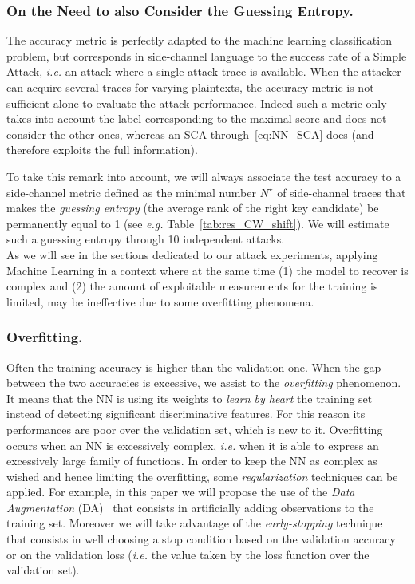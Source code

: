 \subsubsection{On the Need to also Consider the Guessing Entropy.} The accuracy metric is perfectly adapted to the machine learning classification problem, but corresponds in side-channel language to the success rate of a Simple Attack, \emph{i.e.} an attack where a single attack trace is available. When the attacker can acquire several traces for varying plaintexts, the accuracy metric is not sufficient alone to evaluate the attack performance.
Indeed such a metric only takes into account the label corresponding to the maximal score and does not consider the other ones, whereas an SCA through~\eqref{eq:NN_SCA} does (and therefore exploits the full information).

To take this remark into account, we will always associate the test accuracy to a side-channel metric defined as the minimal number  $N^\star$ of side-channel traces that makes the \emph{guessing entropy} (the average rank of the right key candidate) be permanently equal to 1 (see \emph{e.g.} Table~\ref{tab:res_CW_shift}). We will estimate such a guessing entropy through 10 independent attacks. \\

As we will see in the sections dedicated to our attack experiments, applying Machine Learning in a context where at the same time (1) the model to recover is complex and (2) the amount of exploitable measurements for the training is limited, may be ineffective due to some overfitting phenomena.

\subsubsection{Overfitting.} Often the training accuracy is higher than the validation one. When the gap between the two accuracies is excessive, we assist to the \emph{overfitting} phenomenon. It means that the NN is using its weights to \emph{learn by heart} the training set instead of detecting significant discriminative features. For this reason its performances are poor over the validation set, which is new to it. Overfitting occurs when an NN is excessively complex, \emph{i.e.} when it is able to express an excessively large family of functions. In order to keep the NN as complex as wished and hence limiting the overfitting, some \emph{regularization} techniques can be applied. For example, in this paper we will propose the use of the
\emph{Data Augmentation} (DA)~\cite{simard2003best} that consists in artificially adding observations to the training set. Moreover we will take advantage of the \emph{early-stopping} technique~\cite{Prechelt2012} that consists in well choosing a stop condition based on the validation accuracy or on the validation loss (\emph{i.e.} the value taken by the loss function over the validation set).



